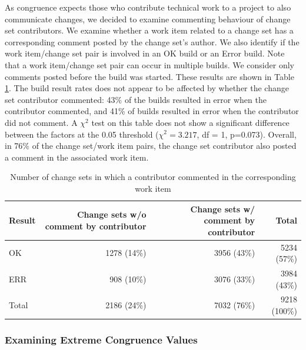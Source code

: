 \documentclass[12pt,oneside]{book}
\begin{document}
As congruence expects those who contribute technical work to a project to also communicate changes, we decided to examine commenting behaviour of change set contributors.
We examine whether a work item related to a change set has a corresponding comment posted by the change set's author. We also identify if the work item/change set pair is involved in an OK build or an Error build. Note that a work item/change set pair can occur in multiple builds. We consider only comments posted before the build was started. These results are shown in Table \ref{tab:changesets_authors}.
The build result rates does not appear to be affected by whether the change set contributor commented: 43\% of the builds resulted in error when the contributor commented, and 41\% of builds resulted in error when the contributor did not comment. A $\chi^2$ test on this table does not show a significant difference between the factors at the 0.05 threshold ($\chi^2 = 3.217$, df = 1, {p=0.073}).
Overall, in 76\% of the change set/work item pairs, the change set contributor also posted a comment in the associated work item.
\begin{table}[t]
\centering
\begin{tabular}{lrrr}
Result & \parbox{0.715in}{\raggedright Change sets w/o comment by contributor\vspace{1pt}} & \parbox{0.715in}{\raggedright Change sets w/ comment by contributor\vspace{1pt}} & Total \\\hline 
OK		& 1278 (14\%) 	& 3956 (43\%) 	& 5234 (57\%) 	\\
ERR		& 908 (10\%) 	& 3076 (33\%)	& 3984 (43\%)	\\\hline
Total 	& 2186 (24\%) 	& 7032 (76\%) 	& 9218 (100\%)	\\
\end{tabular}
\caption{Number of change sets in which a contributor commented in the corresponding work item}
\label{tab:changesets_authors}
\end{table}


\subsubsection{Examining Extreme Congruence Values}
\label{sec:extremecongruence}
\end{document}
